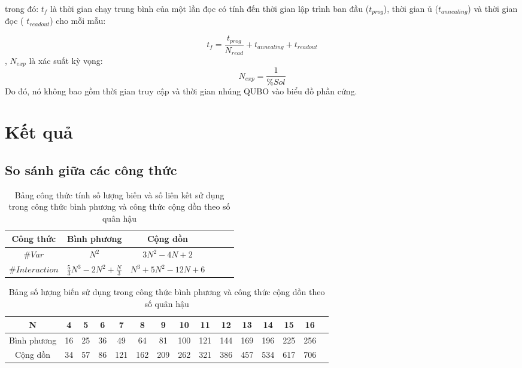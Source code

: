 trong đó: 
 $t_f$ là thời gian chạy trung bình của một lần đọc có tính đến thời gian lập trình ban đầu ($t_{prog}$), thời gian ủ ($t_{annealing}$) và thời gian đọc ( $t_{readout}$) cho mỗi mẫu:
		
		$$t_f = \frac{t_{prog}}{N_{read}} + t_{annealing} + t_{readout}$$
, $N_{exp}$ là xác suất kỳ vọng:
$$N_{exp} = \frac{1}{\%Sol}$$
Do đó, nó không bao gồm thời gian truy cập và thời gian nhúng QUBO vào biểu đồ phần cứng.

\section{Kết quả}

	\subsection{So sánh giữa các công thức }
	
	\begin{table}[H]
		\centering
		\begin{tabular}{ c c c c c c}
			\hline
			Công thức & \textbf{Bình phương} & \textbf{Cộng dồn} \\
			\hline
			\textbf{$\#Var$}     & $N^2$ & $3N^2 - 4N + 2$ \\
			\textbf{$\#Interaction$}     & $\frac{5}{3}N^3 - 2N^2 + \frac{N}{3}$ & $N^3 + 5N^2 -12N +6$\\
			
			\hline
		\end{tabular}
		\caption{Bảng công thức tính số lượng biến và số liên kết sử dụng trong công thức bình phương và công thức cộng dồn theo số quân hậu}
		\label{tab:var_and_interaction}
	\end{table}
	
		
	\begin{table}[H]
		\centering
		\begin{tabular}{|c|c|c|c|c|c|c|c|c|c|c|c|c|c|c|}
			\hline
			N & 4 & 5 & 6 & 7 & 8 & 9 & 10 & 11 & 12 & 13 & 14 & 15 & 16 \\
			\hline
			Bình phương & 16 & 25 & 36 & 49 & 64 & 81 & 100 & 121 & 144 & 169 & 196 & 225 & 256 \\
			\hline
			Cộng dồn & 34 & 57 & 86 & 121 & 162 & 209 & 262 & 321 & 386 & 457 & 534 & 617 & 706 \\
			\hline
		\end{tabular}
		
		
		
		\caption{Bảng số lượng biến sử dụng trong công thức bình phương và công thức cộng dồn theo số quân hậu}
		\label{tab:var_num}
	\end{table}
	
